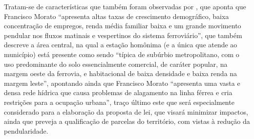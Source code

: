 	Tratam-se de características que também foram observadas por , que aponta que Francisco Morato ``apresenta altas taxas de crescimento demográfico,	baixa concentração de empregos, renda	média familiar baixa e um grande movimento pendular nos fluxos matinais e vespertinos do sistema ferroviário'', que também descreve a área central, na qual a estação homônima (e a única que atende ao município) está presente como sendo ``típica de subúrbio metropolitano, com o uso predominante do solo essencialmente comercial, de caráter popular, na margem oeste da ferrovia, e habitacional de baixa densidade e baixa renda na margem leste'', apontando ainda que Francisco Morato ``apresenta uma vasta e densa rede hídrica que causa problemas de alagamento na linha férrea e cria restrições para a ocupação urbana'', traço último este que será especialmente considerado para a elaboração da proposta de lei, que visará minimizar impactos, ainda que preveja a qualificação de parcelas do território, com vistas à redução da pendularidade.
	
